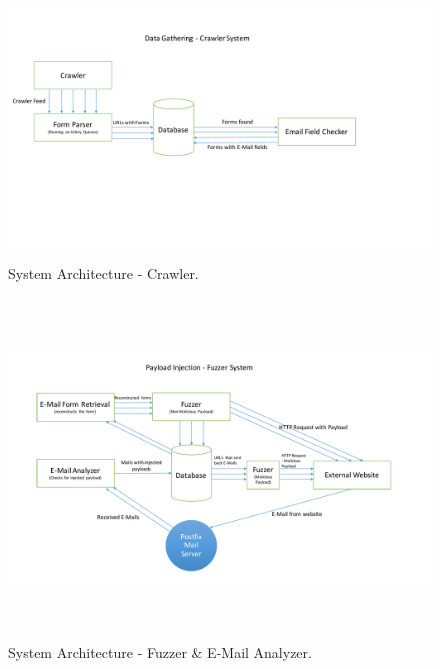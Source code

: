 \begin{figure}
	\centering
	\includegraphics[width=16cm, height=7cm]{System/crawler_design}
	\caption{System Architecture - Crawler.}
	\label{fig:crawler}
\end{figure}


\begin{figure}
	\centering
	\includegraphics[width=16cm, height=9cm]{System/fuzzer_design}
	\caption{System Architecture - Fuzzer {\&} E-Mail Analyzer.}
	\label{fig:fuzzer}
\end{figure}
